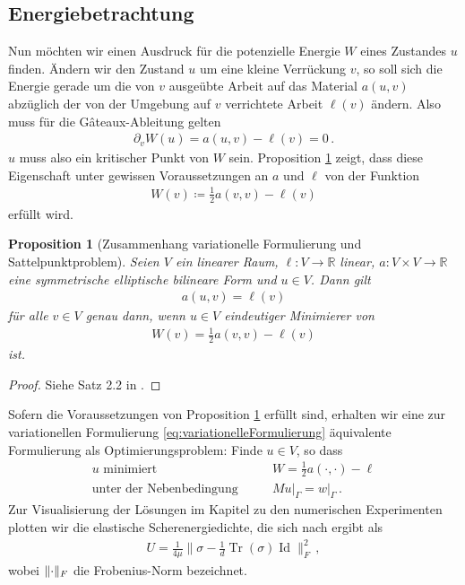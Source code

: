 \documentclass{scrartcl}
\newcounter{everything}
\newtheorem{proposition}[everything]{Proposition}
\def\R{\mathbb{R}}
\DeclareMathOperator{\Id}{Id}             %
\DeclareMathOperator{\Tr}{Tr}       	  %
\DeclarePairedDelimiter{\norm}{\lVert}{\rVert}
\begin{document}
\subsection{Energiebetrachtung}
Nun möchten wir einen Ausdruck für die potenzielle Energie $W$ eines Zustandes $u$ finden. Ändern wir den Zustand $u$ um eine kleine Verrückung $v$, so soll sich die Energie gerade um die von $v$ ausgeübte Arbeit auf das Material $a(u,v)$ abzüglich der von der Umgebung auf $v$ verrichtete Arbeit $\ell(v)$ ändern. Also muss für die Gâteaux-Ableitung gelten
\begin{align*}
	\partial_vW(u)=a(u,v)-\ell(v)=0\,.
\end{align*}
$u$ muss also ein kritischer Punkt von $W$ sein.
Proposition \ref{pr:äquivVariationellSattelpunkt} zeigt, dass diese Eigenschaft unter gewissen Voraussetzungen an $a$ und $\ell$ von der Funktion
\begin{align}
	W(v)\coloneqq\frac{1}{2}a(v,v)-\ell(v)
	\label{eq:DefinitionW}
\end{align}
erfüllt wird.
\begin{proposition}[Zusammenhang variationelle Formulierung und Sattelpunktproblem] \label{pr:äquivVariationellSattelpunkt}
	Seien $V$ ein linearer Raum, $\ell\colon V\to\R$ linear, $a\colon V\times V\to\R$ eine symmetrische elliptische bilineare Form und $u\in V$. Dann gilt 
	\begin{align*}
		a(u,v)=\ell(v)
	\end{align*}
	für alle $v\in V$ genau dann, wenn $u\in V$ eindeutiger Minimierer von
	\begin{align*}
		W(v)=\frac{1}{2}a(v,v)-\ell(v)
	\end{align*}
	ist.
\end{proposition}
\begin{proof}
	Siehe Satz 2.2 in \cite[S.34]{Bra-2007}.
\end{proof}
Sofern die Voraussetzungen von Proposition \ref{pr:äquivVariationellSattelpunkt} erfüllt sind, erhalten wir eine zur variationellen Formulierung \eqref{eq:variationelleFormulierung} äquivalente Formulierung als Optimierungsproblem: Finde $u\in V$, so dass
\begin{equation}
	\begin{aligned}
		u\text{ minimiert }&&  &W=\frac{1}{2}a(\cdot,\cdot)-\ell \\
	\text{unter der Nebenbedingung }&&  &Mu\big\vert_\Gamma = w\big\vert_\Gamma\,.
	\end{aligned}
	\label{eq:sattelpunktFormulierung}
\end{equation}
Zur Visualisierung der Lösungen im Kapitel zu den numerischen Experimenten plotten wir die elastische Scherenergiedichte, die sich nach \cite[S.252]{Alb-2002} ergibt als
\begin{align*}
	U=\frac{1}{4\mu}\big\lVert\sigma-\frac{1}{d}\Tr(\sigma)\Id\big\rVert_F^2\,,
\end{align*}
wobei $\norm{\cdot}_F$ die Frobenius-Norm bezeichnet.
\end{document}
